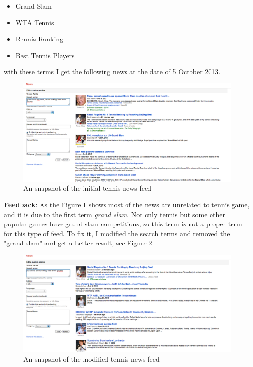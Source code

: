 \documentclass[10pt]{article}
\begin{document}
\begin{itemize}
\item{Grand Slam}
\item{WTA Tennis}
\item{Rennis Ranking}
\item{Best Tennis Players}
\end{itemize}
with these terms I get the following news at the date of 5 October 2013. 

\begin{figure}[h]
\begin{center}
    \centering 
    \includegraphics[scale=.52]{pic3.png}
    \caption{An snapshot of the initial tennis news feed}
    \label{tennisfeed} 
\end{center}
\end{figure}

\textbf{Feedback}: As the Figure \ref{tennisfeed} shows most of the news are unrelated to tennis game, and it is due to the first term \emph{grand slam}. Not only tennis but some other popular games have grand slam competitions, so this term is not a proper term for this type of feed. To fix it, I modified the search terms and removed the "grand slam" and get a better result, see Figure \ref{tennisfeedBetter}.

\begin{figure}[h]
\begin{center}
    \centering 
    \includegraphics[scale=.52]{pic33.png}
    \caption{An snapshot of the modified tennis news feed}
    \label{tennisfeedBetter} 
\end{center}
\end{figure}
\end{document}
